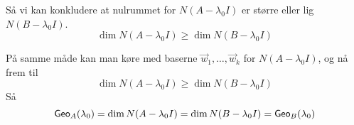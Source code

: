 \begin{bevis}
\begin{enumerate}[1.]
		Så vi kan konkludere at nulrummet for $N(A-\lambda_0 I)$ er større eller
		lig $N(B-\lambda_0 I)$.
		\[
			\dim N(A-\lambda_0I) \ge \dim N(B-\lambda_0I)
		\]

		På samme måde kan man køre med baserne $\vec{w}_1,\dotsc, \vec{w}_k$
		for $N(A-\lambda_0I)$, og nå frem til
		\[
			\dim N(A-\lambda_0I) \ge \dim N(B-\lambda_0I)
		\]
		Så
		\[
			\textsf{Geo}_{A}(\lambda_0) =
			\dim N(A-\lambda_0I) =
			\dim N(B-\lambda_0I) =
			\textsf{Geo}_{B}(\lambda_0)
		\]
	\end{enumerate}
\end{bevis}
